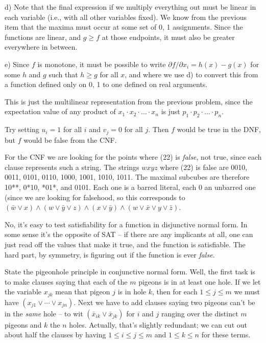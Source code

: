 \vskip 0.05in
\noindent d) Note that the final expression if we multiply everything out
must be linear in each variable (i.e., with all other variables fixed).  We
know from the previous item that the maxima must occur at some set
of 0, 1 assignments.  Since the functions are linear, and $g \geq f$
at those endpoints, it must also be greater everywhere in between.

\vskip 0.05in
\noindent e) Since $f$ is monotone, it must be possible to write
$\partial f / \partial x_i = h\left(x\right) - g\left(x\right)$ for some
$h$ and $g$ such that $h \geq g$ for all $x$, and where we use d)
to convert this from a function defined only on 0, 1 to one defined on
real arguments.

\vskip 0.1in  This is just the multilinear representation
from the previous problem, since the expectation value of any product
of $x_1 \cdot x_2 \cdot \ldots \cdot x_n$ is just $p_1 \cdot p_2 \cdot \ldots \cdot p_n$.

\vskip 0.1in  Try setting $u_i = 1$ for all $i$ and
$v_j = 0$ for all $j$.  Then $f$ would be true in the DNF, but $f$ would
be false from the CNF.

\vskip 0.1in  For the CNF we are looking for 
the points where (22) is {\it false}, not true, since each clause represents
such a string.  The strings $wxyz$ where (22) is false are
0010, 0011, 0101, 0110, 1000, 1001, 1010, 1011.  The maximal
subcubes are therefore 10**, 0*10, *01*, and 0101.  Each one is a barred
literal, each 0 an unbarred one (since we are looking for falsehood, so this
corresponds to $\left(\bar w \vee x\right) \land \left(w \vee \bar y \vee z\right)
\land \left(x \vee \bar y\right) \land \left(w \vee \bar x \vee y \vee \bar z\right)$.

\vskip 0.1in  No, it's easy to test satisfiability
for a function in disjunctive normal form.  In some sense it's the opposite
of SAT -- if there are any implicants at all, one can just read off the values
that make it true, and the function is satisfiable.  The hard part, by symmetry,
is figuring out if the function is ever {\it false}.

\vskip 0.1in  State the pigeonhole principle in
conjunctive normal form.  Well, the first task is to make clauses saying
that each of the $m$ pigeons is in at least one hole.  If we let the
variable $x_{jk}$ mean that pigeon $j$ is in hole $k$, then for each
$1 \leq j \leq m$ we must have $\left(x_{j1} \vee \cdots \vee x_{jn}\right)$.
Next we have to add clauses saying two pigeons can't be in the {\it same}
hole -- to wit $\left(\bar x_{ik} \vee \bar x_{jk}\right)$ for $i$ and $j$ ranging
over the distinct $m$ pigeons and $k$ the $n$ holes.  Actually, that's slightly redundant;
we can cut out about half the clauses by having $1 \leq i \le j \leq m$ and
$1 \leq k \leq n$ for these terms.

